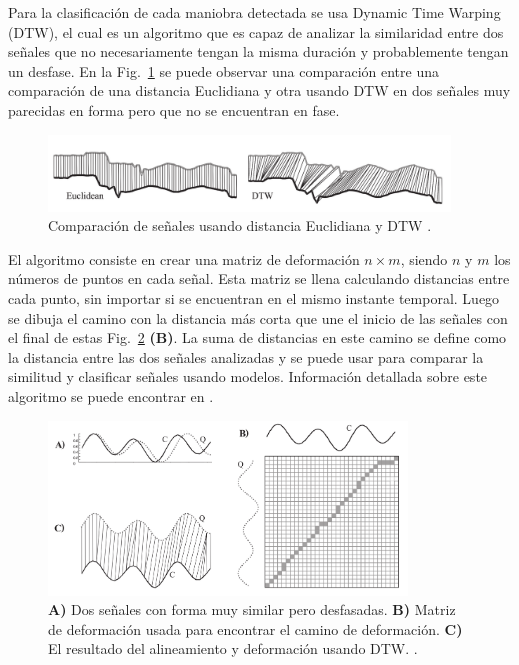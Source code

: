 Para la clasificación de cada maniobra detectada se usa Dynamic Time Warping (DTW), el cual es un algoritmo que es capaz de analizar la similaridad entre dos señales que no necesariamente tengan la misma duración y probablemente tengan un desfase. En la Fig.~\ref{fig:2.4} se puede observar una comparación entre una comparación de una distancia Euclidiana y otra usando DTW en dos señales muy parecidas en forma pero que no se encuentran en fase.


\begin{figure}[htbp!]
\centering
\includegraphics[width=0.95\textwidth]{Fig4}
\caption[Comparación de señales usando distancia Euclidiana y DTW]{Comparación de señales usando distancia Euclidiana y DTW \cite{Keogh2005}.}
\label{fig:2.4}
\end{figure}

El algoritmo consiste en crear una matriz de deformación $n \times m$, siendo $n$ y $m$ los números de puntos en cada señal. Esta matriz se llena calculando distancias entre cada punto, sin importar si se encuentran en el mismo instante temporal. Luego se dibuja el camino con la distancia más corta que une el inicio de las señales con el final de estas Fig.~\ref{fig:2.5} {\bf (B)}. La suma de distancias en este camino se define como la distancia entre las dos señales analizadas y se puede usar para comparar la similitud y clasificar señales usando modelos. Información detallada sobre este algoritmo se puede encontrar en \cite{Keogh2005}.
\begin{figure}[htpb!]
\centering
\includegraphics[width=0.85\textwidth]{Fig5}
\caption[Algoritmo de {\it Dynamic Time Warping}]{{\bf A)} Dos señales con forma muy similar pero desfasadas. {\bf B)} Matriz de deformación usada para encontrar el camino de deformación. {\bf C)} El resultado del alineamiento y deformación usando DTW. \cite{Keogh2005}.}
\label{fig:2.5}
\end{figure}

